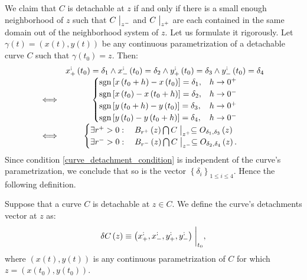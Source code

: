 \documentclass[11pt]{book}
\begin{document}
We claim that $C$ is detachable at $z$ if and only if there is
a small enough neighborhood of $z$ such that $C\bigm\lvert_{z^{-}}$
and $C\bigm\lvert_{z^{+}}$ are each contained in the same domain
out of the neighborhood system of $z$. Let us formulate it
rigorously. Let $\gamma\left(t\right)=\left(x\left(t\right),y\left(t\right)\right)$
be any continuous parametrization of a detachable curve $C$ such
that $\gamma\left(t_{0}\right)=z$. Then:
\[
\label{curve_detachment_condition}\begin{array}{cc}
 & x_{+}^{;}\left(t_{0}\right)=\delta_{1}\land x_{-}^{;}\left(t_{0}\right)=\delta_{2}\land y_{+}^{;}\left(t_{0}\right)=\delta_{3}\land y_{-}^{;}\left(t_{0}\right)=\delta_{4}\\
\Longleftrightarrow & \begin{cases}
\text{sgn}\left[x\left(t_{0}+h\right)-x\left(t_{0}\right)\right]=\delta_{1}, & h\rightarrow0^{+}\\
\text{sgn}\left[x\left(t_{0}\right)-x\left(t_{0}+h\right)\right]=\delta_{2}, & h\rightarrow0^{-}\\
\text{sgn}\left[y\left(t_{0}+h\right)-y\left(t_{0}\right)\right]=\delta_{3}, & h\rightarrow0^{+}\\
\text{sgn}\left[y\left(t_{0}\right)-y\left(t_{0}+h\right)\right]=\delta_{4}, & h\rightarrow0^{-}
\end{cases}\\
\Longleftrightarrow & \begin{cases}
\exists r^{+}>0:\quad B_{r^{+}}\left(z\right)\bigcap C\bigm\lvert_{z^{+}}\subseteq O_{\delta_{1},\delta_{3}}\left(z\right)\\
\exists r^{-}>0:\quad B_{r^{-}}\left(z\right)\bigcap C\bigm\lvert_{z^{-}}\subseteq O_{\delta_{2},\delta_{4}}\left(z\right).
\end{cases}
\end{array}
\]
Since condition \ref{curve_detachment_condition} is independent of the curve's parametrization,
we conclude that so is the vector $\left\{ \delta_{i}\right\} _{1\leq i\leq4}$.
Hence the following definition.

\begin{definition}
Suppose that a curve $C$ is detachable at $z\in C$. We define the
curve's detachments vector at $z$ as:
\[
\delta C\left(z\right)\equiv\left(x_{+}^{;},x_{-}^{;},y_{+}^{;},y_{-}^{;}\right)\biggm\lvert_{t_{0}},
\]
where $\left(x\left(t\right),y\left(t\right)\right)$ is any continuous
parametrization of $C$ for which $z=\left(x\left(t_{0}\right),y\left(t_{0}\right)\right)$.
\end{definition}
\end{document}
